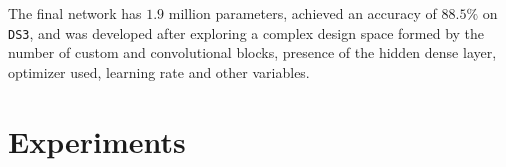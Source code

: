 \documentclass[11pt]{article}
\begin{document}
\begin{multicols}{2}
      The final network has $1.9$ million parameters, achieved an accuracy of $88.5\%$ on \texttt{DS3}, and was developed after exploring a complex design space formed by the number of custom and convolutional blocks, presence of the hidden dense layer, optimizer used, learning rate and other variables.

      \label{sec:experiments}
      \section{Experiments}



\end{multicols}
\end{document}
